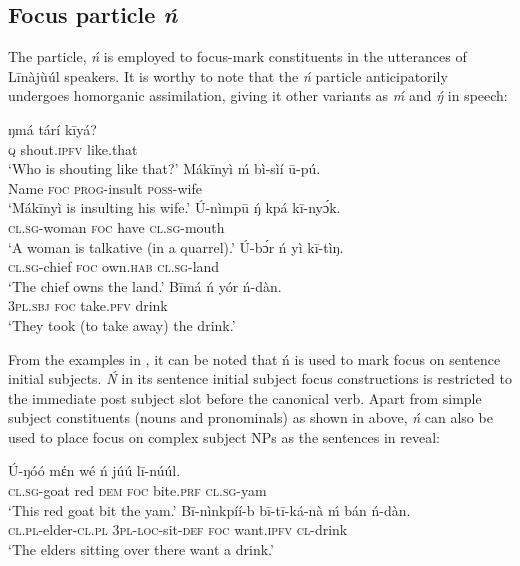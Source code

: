 \documentclass[output=paper,colorlinks,citecolor=brown]{langscibook}
\begin{document}
\subsection{Focus particle \textit{ń}}\label{sec:bisilki:5.1}

The particle, \textit{ń} is employed to focus-mark constituents in the utterances of Līnàjùúl speakers. It is worthy to note that the \textit{ń} particle anticipatorily undergoes homorganic assimilation, giving it other variants as \textit{ḿ} and \textit{ŋ́} in speech:

\ea%
    \label{ex:bisilki:8}
    \ea\label{ex:bisilki:8a}
        \ea\label{ex:bisilki:8ai}
        \gll    ŋmá	tárí		kīyá?\\
                \textsc{q}	shout\textsc{.ipfv}	like.that\\
        \glt    ‘Who is shouting like that?’
        \ex\label{ex:bisilki:8aii}
        \gll    Mákīnyì	ḿ	bì-sìí		ū-pú.\\
                Name		\textsc{foc}	\textsc{prog-}insult	\textsc{poss-}wife\\
        \glt    ‘Mákīnyì is insulting his wife.’
        \z
    \ex\label{ex:bisilki:8b}
    \gll    Ú-nìmpū		ŋ́	kpá	kī-nyɔ́k.\\
            \textsc{cl.sg-}woman	\textsc{foc}	have	\textsc{cl.sg-}mouth\\
    \glt    ‘A woman is talkative (in a quarrel).’
    \ex\label{ex:bisilki:8c}
    \gll    Ú-bɔ́r		ń	yì		kī-tìŋ.\\
            \textsc{cl.sg-}chief	\textsc{foc}	own\textsc{.hab}	\textsc{cl.sg-}land\\
    \glt    ‘The chief owns the land.’
    \ex\label{ex:bisilki:8d}
    \gll    Bīmá		ń	yór		ń-dàn.\\
            \textsc{3pl.sbj}	\textsc{foc}	take\textsc{.pfv}	drink\\
    \glt    ‘They took (to take away) the drink.’
    \z
\z

From the examples in , it can be noted that ń is used to mark focus on sentence initial subjects. \textit{Ń} in its sentence initial subject focus constructions is restricted to the immediate post subject slot before the canonical verb. Apart from simple subject constituents (nouns and pronominals) as shown in  above,\textit{ ń} can also be used to place focus on complex subject NPs as the sentences in  reveal:

\ea%
    \label{ex:bisilki:9}
    \ea\label{ex:bisilki:9a}
    \gll    Ú-ŋóó	mέn		wé	ń	júú		lī-núúl.\\
            \textsc{cl.sg-}goat	red	\textsc{dem}	\textsc{foc}	bite\textsc{.prf}	\textsc{cl.sg-}yam\\
    \glt    ‘This red goat bit the yam.’
    \ex\label{ex:bisilki:9b}
    \gll    Bī-nìnkpíí-b	         bī-tī-ká-nà	    ḿ           bán	 ń-dàn.\\
            \textsc{cl.pl-}elder\textsc{-cl.pl}   \textsc{3pl-loc-}sit\textsc{-def}	   \textsc{foc}	      want\textsc{.ipfv}	 \textsc{cl-}drink\\
    \glt    ‘The elders sitting over there want a drink.’
    \z
\z
\end{document}
